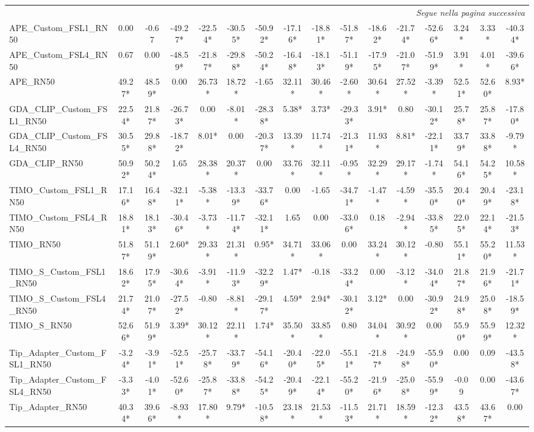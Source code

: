 \begin{scriptsize}
\begin{longtable}{l|ccccccccccccccc}
\midrule
\endhead
\midrule
\multicolumn{16}{r}{\textit{Segue nella pagina successiva}} \\
\endfoot
\bottomrule
\endlastfoot
APE\_Custom\_FSL1\_RN50 & 0.00 & -0.67 & -49.27* & -22.54* & -30.55* & -50.92* & -17.16* & -18.81* & -51.87* & -18.62* & -21.74* & -52.66* & 3.24* & 3.33* & -40.34* \\
APE\_Custom\_FSL4\_RN50 & 0.67 & 0.00 & -48.59* & -21.87* & -29.88* & -50.24* & -16.48* & -18.13* & -51.19* & -17.95* & -21.07* & -51.99* & 3.91* & 4.01* & -39.66* \\
APE\_RN50 & 49.27* & 48.59* & 0.00 & 26.73* & 18.72* & -1.65 & 32.11* & 30.46* & -2.60* & 30.64* & 27.52* & -3.39* & 52.51* & 52.60* & 8.93* \\
GDA\_CLIP\_Custom\_FSL1\_RN50 & 22.54* & 21.87* & -26.73* & 0.00 & -8.01* & -28.38* & 5.38* & 3.73* & -29.33* & 3.91* & 0.80 & -30.12* & 25.78* & 25.87* & -17.80* \\
GDA\_CLIP\_Custom\_FSL4\_RN50 & 30.55* & 29.88* & -18.72* & 8.01* & 0.00 & -20.37* & 13.39* & 11.74* & -21.31* & 11.93* & 8.81* & -22.11* & 33.79* & 33.88* & -9.79* \\
GDA\_CLIP\_RN50 & 50.92* & 50.24* & 1.65 & 28.38* & 20.37* & 0.00 & 33.76* & 32.11* & -0.95* & 32.29* & 29.17* & -1.74* & 54.16* & 54.25* & 10.58* \\
TIMO\_Custom\_FSL1\_RN50 & 17.16* & 16.48* & -32.11* & -5.38* & -13.39* & -33.76* & 0.00 & -1.65 & -34.71* & -1.47* & -4.59* & -35.50* & 20.40* & 20.49* & -23.18* \\
TIMO\_Custom\_FSL4\_RN50 & 18.81* & 18.13* & -30.46* & -3.73* & -11.74* & -32.11* & 1.65 & 0.00 & -33.06* & 0.18 & -2.94* & -33.85* & 22.05* & 22.14* & -21.53* \\
TIMO\_RN50 & 51.87* & 51.19* & 2.60* & 29.33* & 21.31* & 0.95* & 34.71* & 33.06* & 0.00 & 33.24* & 30.12* & -0.80 & 55.11* & 55.20* & 11.53* \\
TIMO\_S\_Custom\_FSL1\_RN50 & 18.62* & 17.95* & -30.64* & -3.91* & -11.93* & -32.29* & 1.47* & -0.18 & -33.24* & 0.00 & -3.12* & -34.04* & 21.87* & 21.96* & -21.71* \\
TIMO\_S\_Custom\_FSL4\_RN50 & 21.74* & 21.07* & -27.52* & -0.80 & -8.81* & -29.17* & 4.59* & 2.94* & -30.12* & 3.12* & 0.00 & -30.92* & 24.98* & 25.08* & -18.59* \\
TIMO\_S\_RN50 & 52.66* & 51.99* & 3.39* & 30.12* & 22.11* & 1.74* & 35.50* & 33.85* & 0.80 & 34.04* & 30.92* & 0.00 & 55.90* & 55.99* & 12.32* \\
Tip\_Adapter\_Custom\_FSL1\_RN50 & -3.24* & -3.91* & -52.51* & -25.78* & -33.79* & -54.16* & -20.40* & -22.05* & -55.11* & -21.87* & -24.98* & -55.90* & 0.00 & 0.09 & -43.58* \\
Tip\_Adapter\_Custom\_FSL4\_RN50 & -3.33* & -4.01* & -52.60* & -25.87* & -33.88* & -54.25* & -20.49* & -22.14* & -55.20* & -21.96* & -25.08* & -55.99* & -0.09 & 0.00 & -43.67* \\
Tip\_Adapter\_RN50 & 40.34* & 39.66* & -8.93* & 17.80* & 9.79* & -10.58* & 23.18* & 21.53* & -11.53* & 21.71* & 18.59* & -12.32* & 43.58* & 43.67* & 0.00 \\
\end{longtable}
\end{scriptsize}